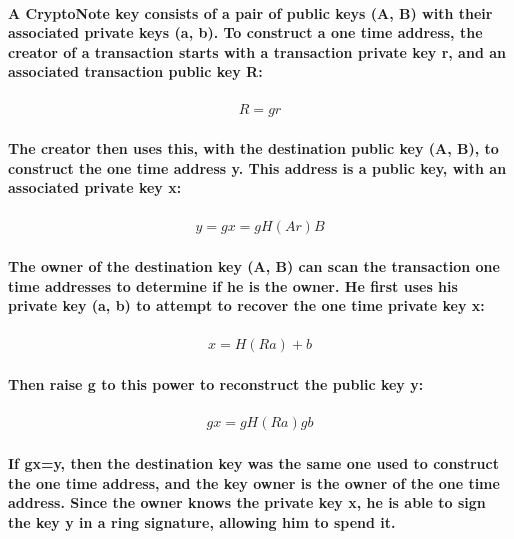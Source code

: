 \documentclass{article}
\begin{document}
\paragraph{A CryptoNote key consists of a pair of public keys (A, B) with their associated private keys (a, b).  To construct a one time address, the creator of a transaction starts with a transaction private key r, and an associated transaction public key R:}

\begin{eqnarray}
  R=gr
\end{eqnarray}

\paragraph{The creator then uses this, with the destination public key (A, B), to construct the one time address y.  This address is a public key, with an associated private key x:}

\begin{eqnarray}
  y=gx=gH(Ar)B
\end{eqnarray}

\paragraph{The owner of the destination key (A, B) can scan the transaction one time addresses to determine if he is the owner.  He first uses his private key (a, b) to attempt to recover the one time private key x:}

\begin{eqnarray}
	x=H(Ra)+b
\end{eqnarray}

\paragraph{Then raise g to this power to reconstruct the public key y:}

\begin{eqnarray}
  gx=gH(Ra)gb
\end{eqnarray}

\paragraph{If gx=y, then the destination key was the same one used to construct the one time address, and the key owner is the owner of the one time address.  Since the owner knows the private key x, he is able to sign the key y in a ring signature, allowing him to spend it.}
\end{document}
